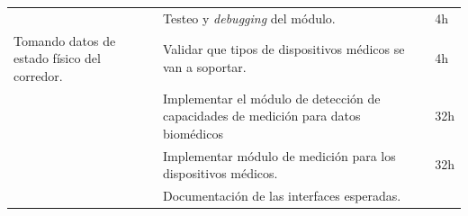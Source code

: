 \begin{longtable}[c]{@{}lll@{}}
\begin{minipage}[t]{0.28\columnwidth}\raggedright
\end{minipage} & \begin{minipage}[t]{0.62\columnwidth}\raggedright
Testeo y \emph{debugging} del módulo.
\end{minipage} & \begin{minipage}[t]{0.10\columnwidth}\raggedright
4h
\end{minipage}
\\\noalign{\medskip}
\begin{minipage}[t]{0.28\columnwidth}\raggedright
Tomando datos de estado físico del corredor.
\end{minipage} & \begin{minipage}[t]{0.62\columnwidth}\raggedright
Validar que tipos de dispositivos médicos se van a soportar.
\end{minipage} & \begin{minipage}[t]{0.10\columnwidth}\raggedright
4h
\end{minipage}
\\\noalign{\medskip}
\begin{minipage}[t]{0.28\columnwidth}\raggedright
\end{minipage} & \begin{minipage}[t]{0.62\columnwidth}\raggedright
Implementar el módulo de detección de capacidades de medición para datos
biomédicos
\end{minipage} & \begin{minipage}[t]{0.10\columnwidth}\raggedright
32h
\end{minipage}
\\\noalign{\medskip}
\begin{minipage}[t]{0.28\columnwidth}\raggedright
\end{minipage} & \begin{minipage}[t]{0.62\columnwidth}\raggedright
Implementar módulo de medición para los dispositivos médicos.
\end{minipage} & \begin{minipage}[t]{0.10\columnwidth}\raggedright
32h
\end{minipage}
\\\noalign{\medskip}
\begin{minipage}[t]{0.28\columnwidth}\raggedright
\end{minipage} & \begin{minipage}[t]{0.62\columnwidth}\raggedright
Documentación de las interfaces esperadas.
\end{minipage} & \begin{minipage}[t]{0.10\columnwidth}\raggedright

\end{minipage}
\end{longtable}
